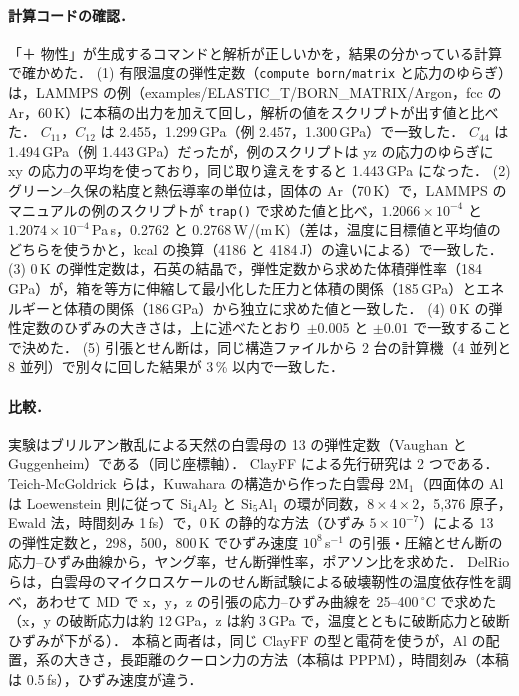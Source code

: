 \documentclass[a4paper,11pt]{article}
\begin{document}
\paragraph{計算コードの確認．}
「＋ 物性」が生成するコマンドと解析が正しいかを，結果の分かっている計算で確かめた．
(1) 有限温度の弾性定数（\texttt{compute born/matrix} と応力のゆらぎ）は，LAMMPS の例（examples/ELASTIC\_T/BORN\_MATRIX/Argon，fcc の Ar，60\,K）に本稿の出力を加えて回し，解析の値をスクリプトが出す値と比べた．
$C_{11}$，$C_{12}$ は 2.455，1.299\,GPa（例 2.457，1.300\,GPa）で一致した．
$C_{44}$ は 1.494\,GPa（例 1.443\,GPa）だったが，例のスクリプトは yz の応力のゆらぎに xy の応力の平均を使っており，同じ取り違えをすると 1.443\,GPa になった．
(2) グリーン--久保の粘度と熱伝導率の単位は，固体の Ar（70\,K）で，LAMMPS のマニュアルの例のスクリプトが \texttt{trap()} で求めた値と比べ，$1.2066\times10^{-4}$ と $1.2074\times10^{-4}$\,Pa\,s，0.2762 と 0.2768\,W/(m\,K)（差は，温度に目標値と平均値のどちらを使うかと，kcal の換算（4186 と 4184\,J）の違いによる）で一致した．
(3) 0\,K の弾性定数は，石英の結晶で，弾性定数から求めた体積弾性率（184\,GPa）が，箱を等方に伸縮して最小化した圧力と体積の関係（185\,GPa）とエネルギーと体積の関係（186\,GPa）から独立に求めた値と一致した．
(4) 0\,K の弾性定数のひずみの大きさは，上に述べたとおり $\pm0.005$ と $\pm0.01$ で一致することで決めた．
(5) 引張とせん断は，同じ構造ファイルから 2 台の計算機（4 並列と 8 並列）で別々に回した結果が 3\,\% 以内で一致した．

\paragraph{比較．}
実験はブリルアン散乱による天然の白雲母の 13 の弾性定数（Vaughan と Guggenheim\cite{vaughan1986}）である（同じ座標軸）．
ClayFF による先行研究は 2 つである．
Teich-McGoldrick ら\cite{teich2012}は，Kuwahara の構造から作った白雲母 2M$_1$（四面体の Al は Loewenstein 則に従って Si$_4$Al$_2$ と Si$_5$Al$_1$ の環が同数，$8\times4\times2$，5{,}376 原子，Ewald 法，時間刻み 1\,fs）で，0\,K の静的な方法（ひずみ $5\times10^{-7}$）による 13 の弾性定数と，298，500，800\,K でひずみ速度 $10^{8}$\,s$^{-1}$ の引張・圧縮とせん断の応力--ひずみ曲線から，ヤング率，せん断弾性率，ポアソン比を求めた．
DelRio ら\cite{delrio2026}は，白雲母のマイクロスケールのせん断試験による破壊靭性の温度依存性を調べ，あわせて MD で x，y，z の引張の応力--ひずみ曲線を 25--400\,$^\circ$C で求めた（x，y の破断応力は約 12\,GPa，z は約 3\,GPa で，温度とともに破断応力と破断ひずみが下がる）．
本稿と両者は，同じ ClayFF の型と電荷を使うが，Al の配置，系の大きさ，長距離のクーロン力の方法（本稿は PPPM），時間刻み（本稿は 0.5\,fs），ひずみ速度が違う．
\end{document}
